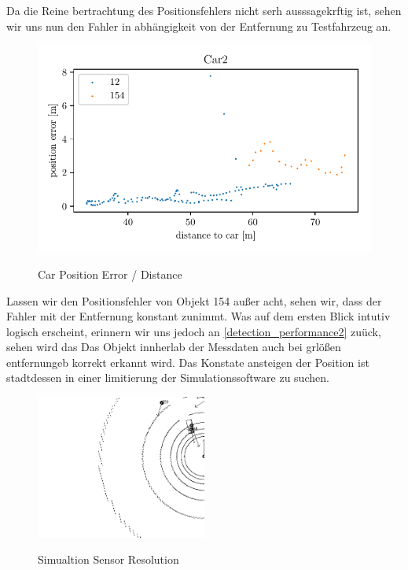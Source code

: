 \documentclass[11pt,oneside,openright]{mpreport}
\begin{document}
Da die Reine bertrachtung des Positionsfehlers nicht serh ausssagekrftig ist, sehen wir uns nun den Fahler in abhängigkeit von der Entfernung zu Testfahrzeug an.

\begin{figure}[!htb]
  \caption{Car Position Error / Distance} 
  \centering
  \includegraphics[width=\textwidth]{bilder/Car2_pos_err_dist.pdf}
 \label{car_pos_err}
\end{figure}

Lassen wir den Positionsfehler von Objekt 154 außer acht, sehen wir, dass der Fahler mit der Entfernung konstant zunimmt. Was auf dem ersten Blick intutiv logisch erscheint,
erinnern wir uns jedoch an \cref{detection_performance2} zuück, sehen wird das Das Objekt innherlab der Messdaten auch bei grlößen entfernungeb korrekt erkannt wird.
Das Konstate ansteigen der Position ist stadtdessen in einer limitierung der Simulationssoftware zu suchen.

\begin{figure}[!htb]
  \caption{Simualtion Sensor Resolution} 
  \centering
  \includegraphics[width=0.5\textwidth]{bilder/sen_err.png}
 \label{sen_res}
\end{figure}
\end{document}
